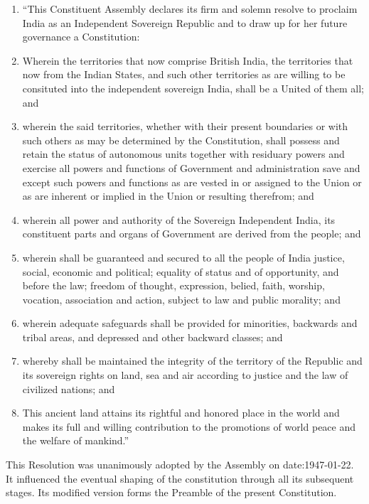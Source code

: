 \begin{multicol}{2}
\begin{enumerate}
  \item \textquotedblleft This Constituent Assembly declares its firm and solemn resolve to proclaim India as an Independent Sovereign Republic and to draw up for her future governance a Constitution:
  \item Wherein the territories that now comprise British India, the territories that now from the Indian States, and such other territories as are willing to be consituted into the independent sovereign India, shall be a United of them all; and
  \item wherein the said territories, whether with their present boundaries or with such others as may be determined by the Constitution, shall possess and retain the status of autonomous units together with residuary powers and exercise all powers and functions of Government and administration save and except such powers and functions as are vested in or assigned to the Union or as are inherent or implied in the Union or resulting therefrom; and
  \item wherein all power and authority of the Sovereign Independent India, its constituent parts and organs of Government are derived from the people; and
  \item wherein shall be guaranteed and secured to all the people of India justice, social, economic and political; equality of status and of opportunity, and before the law; freedom of thought, expression, belied, faith, worship, vocation, association and action, subject to law and public morality; and
  \item wherein adequate safeguards shall be provided for minorities, backwards and tribal areas, and depressed and other backward classes; and
  \item whereby shall be maintained the integrity of the territory of the Republic and its sovereign rights on land, sea and air according to justice and the law of civilized nations; and
  \item This ancient land attains its rightful and honored place in the world and makes its full and willing contribution to the promotions of world peace and the welfare of mankind.\textquotedblright

\end{enumerate}

This Resolution was unanimously adopted by the Assembly on \gls{date:1947-01-22}. It influenced the eventual shaping of the constitution through all its subsequent stages. Its modified version forms the Preamble of the present Constitution.


\end{multicol}
